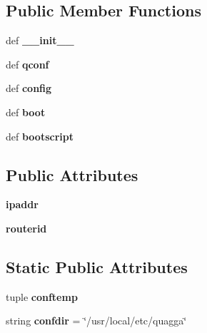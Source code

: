 \subsection*{Public Member Functions}
\begin{DoxyCompactItemize}
\item 
\hypertarget{classospfmanetmdrtest_1_1_manet_node_adf024ddf66ce834043b1b903b1cf90f2}{def {\bfseries \+\_\+\+\_\+init\+\_\+\+\_\+}}\label{classospfmanetmdrtest_1_1_manet_node_adf024ddf66ce834043b1b903b1cf90f2}

\item 
\hypertarget{classospfmanetmdrtest_1_1_manet_node_a64ef48afb0f74729656c06925f3923ec}{def {\bfseries qconf}}\label{classospfmanetmdrtest_1_1_manet_node_a64ef48afb0f74729656c06925f3923ec}

\item 
\hypertarget{classospfmanetmdrtest_1_1_manet_node_a507c62c33e58bf307a8695cdfe2a0c8e}{def {\bfseries config}}\label{classospfmanetmdrtest_1_1_manet_node_a507c62c33e58bf307a8695cdfe2a0c8e}

\item 
\hypertarget{classospfmanetmdrtest_1_1_manet_node_ab5f3d2da28a096cb5ece35852f18f5da}{def {\bfseries boot}}\label{classospfmanetmdrtest_1_1_manet_node_ab5f3d2da28a096cb5ece35852f18f5da}

\item 
\hypertarget{classospfmanetmdrtest_1_1_manet_node_a925e025c2647c97032ebfc4909ce0d49}{def {\bfseries bootscript}}\label{classospfmanetmdrtest_1_1_manet_node_a925e025c2647c97032ebfc4909ce0d49}

\end{DoxyCompactItemize}
\subsection*{Public Attributes}
\begin{DoxyCompactItemize}
\item 
\hypertarget{classospfmanetmdrtest_1_1_manet_node_a359c59db09f405cdbcc64d9b5ef5436b}{{\bfseries ipaddr}}\label{classospfmanetmdrtest_1_1_manet_node_a359c59db09f405cdbcc64d9b5ef5436b}

\item 
\hypertarget{classospfmanetmdrtest_1_1_manet_node_a17db32fd0c394bb83579f77d71212ac6}{{\bfseries routerid}}\label{classospfmanetmdrtest_1_1_manet_node_a17db32fd0c394bb83579f77d71212ac6}

\end{DoxyCompactItemize}
\subsection*{Static Public Attributes}
\begin{DoxyCompactItemize}
\item 
tuple {\bfseries conftemp}
\item 
\hypertarget{classospfmanetmdrtest_1_1_manet_node_aff4e7957b3b691bfee463cd28fc8df4c}{string {\bfseries confdir} = \char`\"{}/usr/local/etc/quagga\char`\"{}}\label{classospfmanetmdrtest_1_1_manet_node_aff4e7957b3b691bfee463cd28fc8df4c}

\end{DoxyCompactItemize}


